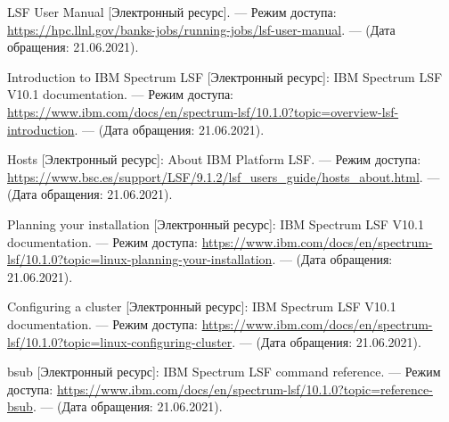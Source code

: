 \begingroup 
\renewcommand{\section}[2]{\anonsection{Список использованных источников и литературы}}
\begin{thebibliography}{00}




    LSF User Manual
    [Электронный ресурс].
    --- Режим доступа: \url{https://hpc.llnl.gov/banks-jobs/running-jobs/lsf-user-manual}.
    --- (Дата обращения: 21.06.2021).

    Introduction to IBM Spectrum LSF [Электронный ресурс]: IBM Spectrum LSF V10.1 documentation.
    --- Режим доступа: \url{https://www.ibm.com/docs/en/spectrum-lsf/10.1.0?topic=overview-lsf-introduction}.
    --- (Дата обращения: 21.06.2021).

    Hosts [Электронный ресурс]: About IBM Platform LSF.
    --- Режим доступа: \url{https://www.bsc.es/support/LSF/9.1.2/lsf_users_guide/hosts_about.html}.
    --- (Дата обращения: 21.06.2021).

    Planning your installation [Электронный ресурс]: IBM Spectrum LSF V10.1 documentation.
    --- Режим доступа: \url{https://www.ibm.com/docs/en/spectrum-lsf/10.1.0?topic=linux-planning-your-installation}.
    --- (Дата обращения: 21.06.2021).

    Configuring a cluster [Электронный ресурс]: IBM Spectrum LSF V10.1 documentation.
    --- Режим доступа: \url{https://www.ibm.com/docs/en/spectrum-lsf/10.1.0?topic=linux-configuring-cluster}.
    --- (Дата обращения: 21.06.2021).

    bsub [Электронный ресурс]: IBM Spectrum LSF command reference.
    --- Режим доступа: \url{https://www.ibm.com/docs/en/spectrum-lsf/10.1.0?topic=reference-bsub}.
    --- (Дата обращения: 21.06.2021).


\end{thebibliography}
\endgroup

\clearpage